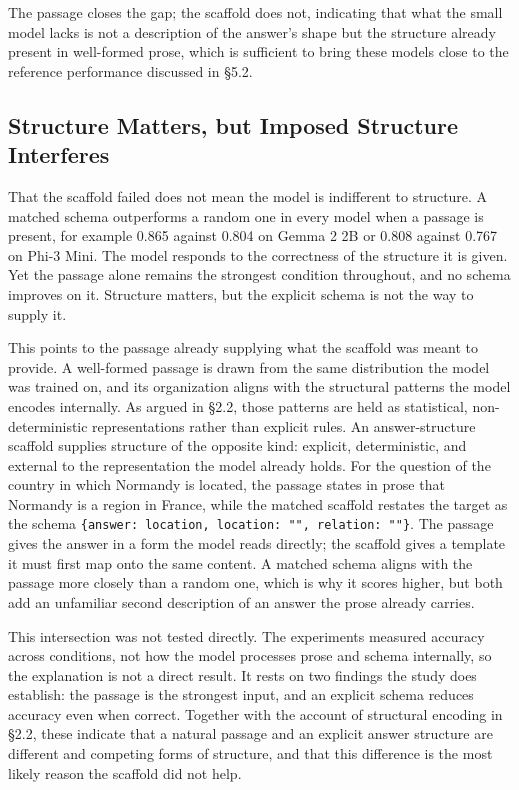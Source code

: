 \documentclass{article}
\begin{document}
The passage closes the gap; the scaffold does not, indicating that what the small model lacks is not a description of the answer's shape but the structure already present in well-formed prose, which is sufficient to bring these models close to the reference performance discussed in \S5.2.

\subsection{Structure Matters, but Imposed Structure Interferes}

That the scaffold failed does not mean the model is indifferent to structure. A matched schema outperforms a random one in every model when a passage is present, for example 0.865 against 0.804 on Gemma 2 2B or 0.808 against 0.767 on Phi-3 Mini. The model responds to the correctness of the structure it is given. Yet the passage alone remains the strongest condition throughout, and no schema improves on it. Structure matters, but the explicit schema is not the way to supply it.

This points to the passage already supplying what the scaffold was meant to provide. A well-formed passage is drawn from the same distribution the model was trained on, and its organization aligns with the structural patterns the model encodes internally. As argued in \S2.2, those patterns are held as statistical, non-deterministic representations rather than explicit rules. An answer-structure scaffold supplies structure of the opposite kind: explicit, deterministic, and external to the representation the model already holds. For the question of the country in which Normandy is located, the passage states in prose that Normandy is a region in France, while the matched scaffold restates the target as the schema \texttt{\{answer: location, location: "", relation: ""\}}. The passage gives the answer in a form the model reads directly; the scaffold gives a template it must first map onto the same content. A matched schema aligns with the passage more closely than a random one, which is why it scores higher, but both add an unfamiliar second description of an answer the prose already carries.

This intersection was not tested directly. The experiments measured accuracy across conditions, not how the model processes prose and schema internally, so the explanation is not a direct result. It rests on two findings the study does establish: the passage is the strongest input, and an explicit schema reduces accuracy even when correct. Together with the account of structural encoding in \S2.2, these indicate that a natural passage and an explicit answer structure are different and competing forms of structure, and that this difference is the most likely reason the scaffold did not help.
\end{document}
